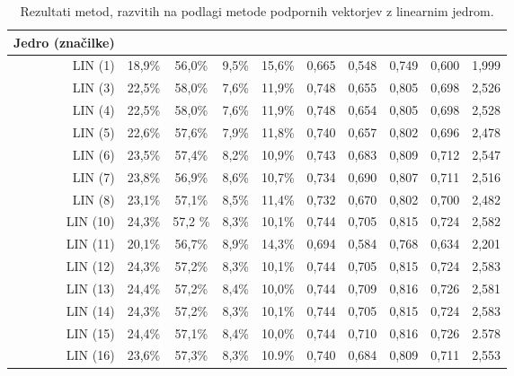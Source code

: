 \documentclass[11pt,a4paper,openany]{book}
\begin{document}
\begin{table}[h!]
	\centering
	\begin{tabular}{r|cccc|cccc|c}		
		\textbf{Jedro \hfill \break (značilke)} & 
		\rotatebox[origin=l]{90}{pravilno pozitivni} & 
		\rotatebox[origin=l]{90}{pravilno negativni} & 
		\rotatebox[origin=l]{90}{napačno pozitivni} & 
		\rotatebox[origin=l]{90}{napačno negativni} &
		\rotatebox[origin=l]{90}{natančnost} & 
		\rotatebox[origin=l]{90}{priklic} & 
		\rotatebox[origin=l]{90}{točnost} & 
		\rotatebox[origin=l]{90}{ocena $F_1$} & 
		\rotatebox[origin=l]{90}{ocena $AMS_2$} \\
		\hline	
		
		LIN (1) & 18,9\% & 56,0\% & 9,5\% & 15,6\% &
		0,665 & 0,548 & 0,749 & 0,600 &
		1,999 \\
		LIN (3) & 22,5\% & 58,0\% & 7,6\% & 11,9\% &
		0,748 & 0,655 & 0,805 & 0,698 &
		2,526 \\
		LIN (4) & 22,5\% & 58,0\% & 7,6\% & 11,9\% &
		0,748 & 0,654 & 0,805 & 0,698 &
		2,528 \\
		LIN (5) & 22,6\% & 57,6\% & 7,9\% & 11,8\% &
		0,740 & 0,657 & 0,802 & 0,696 &
		2,478 \\
		LIN (6) & 23,5\% & 57,4\% & 8,2\% & 10,9\% &
		0,743 & 0,683 & 0,809 & 0,712 & 
		2,547 \\
		LIN (7) & 23,8\% & 56,9\% & 8,6\% & 10,7\% &
		0,734 & 0,690 & 0,807 & 0,711 & 
		2,516 \\
		LIN (8) & 23,1\% & 57,1\%&  8,5\% & 11,4\% &
		0,732 & 0,670 & 0,802 & 0,700 &
		2,482 \\		
		LIN (10) & 24,3\% & 57,2 \% & 8,3\% & 10,1\% &
		0,744 & 0,705 & 0,815 & 0,724 &
		2,582 \\	
		LIN (11) & 20,1\% & 56,7\% & 8,9\% & 14,3\% &
		0,694 & 0,584 & 0,768 & 0,634 &
		2,201 \\
		LIN (12) & 24,3\% & 57,2\% & 8,3\% & 10,1\% &
		0,744 & 0,705 & 0,815 & 0,724 &
		2,583 \\
		LIN (13) & 24,4\% & 57,2\% & 8,4\% & 10,0\% &
		0,744 & 0,709 & 0,816 & 0,726 &
		2,581 \\
		LIN (14) & 24,3\% & 57,2\% & 8,3\% & 10,1\% &
		0,744 & 0,705 & 0,815 & 0,724 &
		2,583 \\
		LIN (15) & 24,4\% & 57,1\% & 8,4\% & 10,0\% & 
		0,744 & 0,710 & 0,816 & 0,726 &
		2.578 \\
		LIN (16) & 23,6\% & 57,3\% & 8,3\% & 10.9\% &
		0,740 & 0,684 & 0,809 & 0,711 &
		2,553 \\	
				
	\end{tabular}
	\caption{Rezultati metod, razvitih na podlagi metode podpornih vektorjev z linearnim jedrom.}
	\label{tb:svm}
\end{table}
\end{document}
